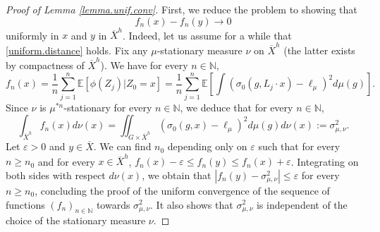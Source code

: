 \documentclass[10pt]{amsart}
\let\epsilon\varepsilon
\let\ts\textstyle
\theoremstyle{plain}
\theoremstyle{definition}
\newcommand\E{\mathbb{E}}
\newcommand\N{\mathbb{N}}
\begin{document}
\begin{proof}[Proof of Lemma \ref{lemma.unif.conv}]
First, we reduce the problem to showing that \begin{equation}\label{uniform.distance}
f_n(x)-f_n(y)\to 0
\end{equation}
uniformly in $x$ and $y$ in $\overline{X}^h$. Indeed, let us assume for a while that \eqref{uniform.distance} holds. Fix any $\mu$-stationary measure $\nu$ on $\overline{X}^h$ (the latter exists by compactness of $\overline{X}^h$). We have for every $n\in \N$,
\begin{equation}\label{expression}f_n(x)=\frac{1}{n}\sum_{j=1}^n{\E[\phi(Z_j)| Z_0=x]}
= \frac{1}{n}\sum_{j=1}^n{\E[\ts\int{(\sigma_0(g, L_{j} \cdot x)-\ell_{\mu})^2 d\mu(g)}]}.
\end{equation}
Since $\nu$ is $\mu^{\ast n}$-stationary for every $n\in \N$, we deduce that for every $n\in \N$,
\[
\int_{\overline{X}^h}{f_n(x) d\nu(x)}=
\iint_{G\times \overline{X}^h}{(\sigma_0(g,x) - \ell_{\mu})^2 d\mu(g) d\nu(x)}:=\sigma^2_{\mu,\nu}.
\]
Let $\epsilon>0$ and $y\in \overline{X}$. We can find $n_0$ depending only on $\epsilon$ such that for every $n\geq n_0$ and for every $x\in \overline{X}^h$, $f_n(x)-\epsilon\leq f_n(y)\leq f_n(x)+\epsilon$. Integrating on both sides with respect $d\nu(x)$, we obtain that $|f_n(y)-\sigma_{\mu,\nu}^2|\leq \epsilon$ for every $n\geq n_0$, concluding the proof of the uniform convergence of the sequence of functions $(f_n)_{n\in \N}$ towards $\sigma_{\mu,\nu}^2$. It also shows that $\sigma^2_{\mu, \nu}$ is independent of the choice of the stationary measure $\nu$.


\end{proof}
\end{document}
